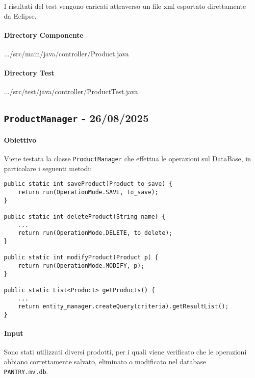 \documentclass{article}
\begin{document}
I risultati del test vengono caricati attraverso un file xml esportato direttamente da Eclipse. 

\paragraph{Directory Componente} 
\begin{code*}
    .../src/main/java/controller/Product.java
\end{code*}
\paragraph{Directory Test} 
\begin{code*}
    .../src/test/java/controller/ProductTest.java
\end{code*}

\subsection{\texttt{ProductManager} - 26/08/2025}
\paragraph{Obiettivo} Viene testata la classe \texttt{ProductManager} che effettua le operazioni sul DataBase, in particolare i seguenti metodi: 
\begin{code*}{}
\begin{verbatim}
public static int saveProduct(Product to_save) {
    return run(OperationMode.SAVE, to_save);	
}

public static int deleteProduct(String name) {
    ...
    return run(OperationMode.DELETE, to_delete);
}

public static int modifyProduct(Product p) {
    return run(OperationMode.MODIFY, p);
}

public static List<Product> getProducts() {
	...
    return entity_manager.createQuery(criteria).getResultList();
}

\end{verbatim}
\end{code*}

\paragraph{Input} Sono stati utilizzati diversi prodotti, per i quali viene verificato che le operazioni abbiano correttamente salvato, eliminato o modificato nel database \texttt{PANTRY.mv.db}. 
\end{document}
